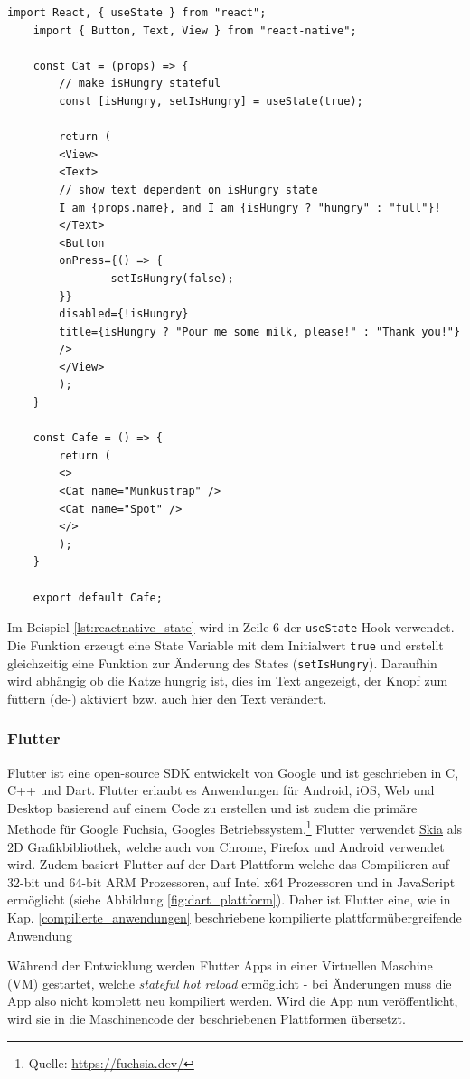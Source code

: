 \begin{lstlisting}[caption=State mit \texttt{useState} Hook, label=lst:reactnative_state]
	import React, { useState } from "react";
	import { Button, Text, View } from "react-native";
	
	const Cat = (props) => {
		// make isHungry stateful
		const [isHungry, setIsHungry] = useState(true);
		
		return (
		<View>
		<Text>
		// show text dependent on isHungry state
		I am {props.name}, and I am {isHungry ? "hungry" : "full"}!
		</Text>
		<Button
		onPress={() => {
				setIsHungry(false);
		}}
		disabled={!isHungry}
		title={isHungry ? "Pour me some milk, please!" : "Thank you!"}
		/>
		</View>
		);
	}
	
	const Cafe = () => {
		return (
		<>
		<Cat name="Munkustrap" />
		<Cat name="Spot" />
		</>
		);
	}
	
	export default Cafe;
\end{lstlisting}

Im Beispiel \ref{lst:reactnative_state} wird in Zeile 6 der \texttt{useState} Hook verwendet. Die Funktion erzeugt eine State Variable mit dem Initialwert \texttt{true} und erstellt gleichzeitig eine Funktion zur Änderung des States (\texttt{setIsHungry}). Daraufhin wird abhängig ob die Katze hungrig ist, dies im Text angezeigt, der Knopf zum füttern (de-) aktiviert bzw. auch hier den Text verändert. \cite{reactnative2021}\\

\subsubsection{Flutter}
\label{flutter}
Flutter ist eine open-source SDK entwickelt von Google und ist geschrieben in C, C++ und Dart.
Flutter erlaubt es Anwendungen für Android, iOS, Web und Desktop basierend auf einem Code zu erstellen und ist zudem die primäre Methode für Google Fuchsia, Googles Betriebssystem.\footnote{Quelle: \url{https://fuchsia.dev/}}
Flutter verwendet \href{https://skia.org/}{Skia} als 2D Grafikbibliothek, welche auch von Chrome, Firefox und Android verwendet wird. Zudem basiert Flutter auf der Dart Plattform welche das Compilieren auf 32-bit und 64-bit ARM Prozessoren, auf Intel x64 Prozessoren und in JavaScript ermöglicht (siehe Abbildung \ref{fig:dart_plattform}). Daher ist Flutter eine, wie in Kap. \ref{compilierte_anwendungen} beschriebene kompilierte plattformübergreifende Anwendung

Während der Entwicklung werden Flutter Apps in einer Virtuellen Maschine (VM) gestartet, welche \textit{stateful hot reload} ermöglicht - bei Änderungen muss die App also nicht komplett neu kompiliert werden. Wird die App nun veröffentlicht, wird sie in die Maschinencode der beschriebenen Plattformen übersetzt.
\\

